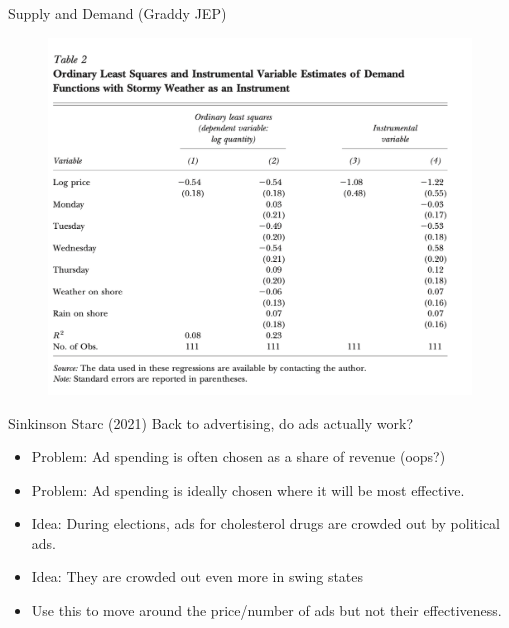 \begin{frame}{Supply and Demand (Graddy JEP)}
\begin{figure}
\centering
\includegraphics[height=\textheight]{./resources/graddy.png}
\end{figure}
\end{frame}


\begin{frame}{Sinkinson Starc (2021)}
Back to advertising, do ads actually work?
\begin{itemize}
\item Problem: Ad spending is often chosen as a share of revenue (oops?)
\item Problem: Ad spending is ideally chosen where it will be most effective.
\item Idea: During elections, ads for cholesterol drugs are crowded out by political ads.
\item Idea: They are crowded out even more in \alert{swing states}
\item Use this to move around the price/number of ads but not their effectiveness.
\end{itemize}
\end{frame}







